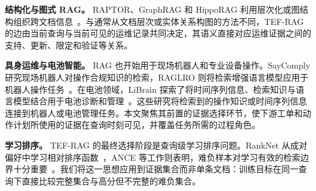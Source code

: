 \textbf{结构化与图式 RAG。}
RAPTOR、GraphRAG 和 HippoRAG 利用层次化或图结构组织跨文档信息~\cite{sarthi2024raptor,edge2024graphrag,gutierrez2024hipporag}。与通常从文档层次或实体关系构图的方法不同，TEF-RAG 的边由当前查询与当前可见的运维记录共同决定，其语义直接对应运维证据之间的支持、更新、限定和验证等关系。

\textbf{具身运维与电池智能。}
RAG 也开始用于现场机器人和专业设备操作。SayComply 研究现场机器人对操作合规知识的检索，RAGLRO 则将检索增强语言模型应用于机器人操作任务~\cite{ginting2025saycomply,wang2026raglro}。在电池领域，LiBrain 探索了将时间序列信息、检索知识与语言模型结合用于电池诊断和管理~\cite{li2026librain}。这些研究将检索到的操作知识或时间序列信息连接到机器人或电池管理任务。本文聚焦其前置的证据选择环节，使下游工单和动作计划所使用的证据在查询时刻可见，并覆盖任务所需的过程角色。

\textbf{学习排序。}
TEF-RAG 的最终选择阶段是查询级学习排序问题。RankNet 从成对偏好中学习相对排序函数~\cite{burges2005ranknet}，ANCE 等工作则表明，难负样本对学习有效的检索边界十分重要~\cite{xiong2021ance}。我们将这一思想应用到证据集合而非单条文档：训练目标在同一查询下直接比较完整集合与高分但不完整的难负集合。
